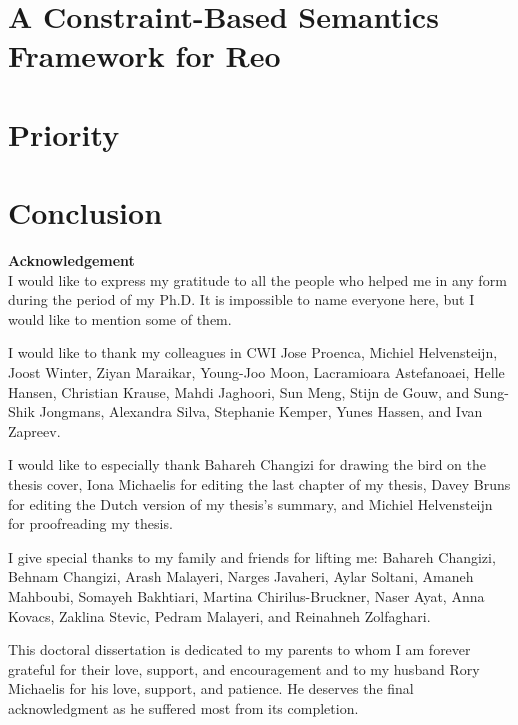 \documentclass[runnngheads]{book}
\begin{document}
\chapter{A Constraint-Based Semantics Framework for Reo}
\label{chapterCASM}

\chapter{Priority}
\label{ch:prio}

\chapter{Conclusion}
\label{ch:concl}
\singlespacing

\clearpage


\newpage


\newpage
{\textbf{\Large{Acknowledgement}}}
\vspace*{1cm}
\\
I would like to express my gratitude to all the people who helped me in any form during the period of my Ph.D. It is impossible to name everyone here, but I would like to mention some of them.

I would like to thank my colleagues in CWI Jose Proenca, Michiel Helvensteijn, Joost Winter, Ziyan Maraikar, Young-Joo Moon, Lacramioara Astefanoaei, Helle Hansen, Christian Krause, Mahdi Jaghoori, Sun Meng, Stijn de Gouw, and Sung-Shik Jongmans, Alexandra Silva, Stephanie Kemper, Yunes Hassen, and Ivan Zapreev.

I would like to especially thank Bahareh Changizi for drawing the bird on the thesis cover, Iona Michaelis for editing the last chapter of my thesis, Davey Bruns for editing the Dutch version of my thesis's summary, and Michiel Helvensteijn for proofreading my thesis.

I give special thanks to my family and friends for lifting me: Bahareh Changizi,  Behnam Changizi, Arash Malayeri, Narges Javaheri, Aylar Soltani, Amaneh Mahboubi, Somayeh Bakhtiari, Martina Chirilus-Bruckner, Naser Ayat, Anna Kovacs, Zaklina Stevic, Pedram Malayeri, and Reinahneh Zolfaghari.

This doctoral dissertation is dedicated to my parents to whom I am forever grateful for their love, support, and encouragement and to my husband Rory Michaelis for his love, support, and patience. He
deserves the final acknowledgment as he suffered most from its completion.
\end{document}
